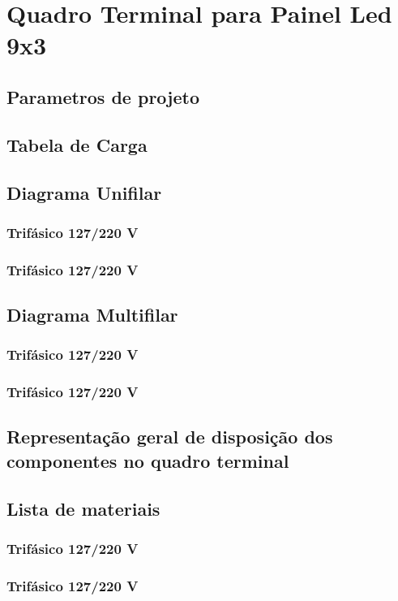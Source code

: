 \section{Quadro Terminal para Painel Led 9x3}
\subsection{Parametros de projeto}
\subsection{Tabela de Carga}
\subsection{Diagrama Unifilar}

\subsubsection{Trifásico 127/220 V}

\subsubsection{Trifásico 127/220 V}

\subsection{Diagrama Multifilar}

\subsubsection{Trifásico 127/220 V}

\subsubsection{Trifásico 127/220 V}

\subsection{Representação geral de disposição dos componentes no quadro terminal}

\subsection{Lista de materiais}

\subsubsection{Trifásico 127/220 V}

\subsubsection{Trifásico 127/220 V}